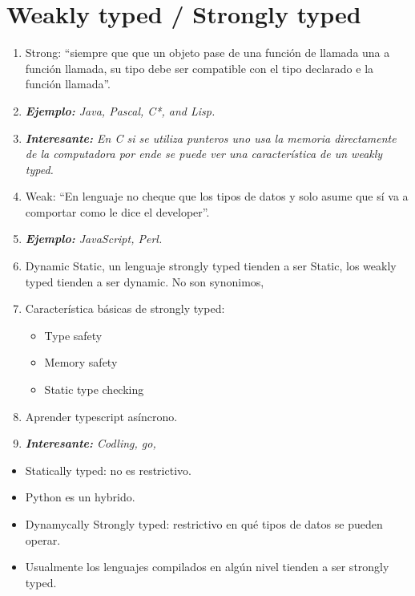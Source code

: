 \section{Weakly typed / Strongly typed}
\begin{enumerate}
    \item Strong: ``siempre que que un objeto pase de una función de llamada una a función llamada, su tipo debe ser compatible con el tipo declarado e la función llamada''.
    \item \emph{\textbf{Ejemplo: }Java, Pascal, C*, and Lisp.}
    \item \emph{\textbf{Interesante:} En C si se utiliza punteros uno usa la memoria directamente de la computadora por ende se puede ver una característica de un weakly typed.}
    \item Weak: ``En lenguaje no cheque que los tipos de datos y solo asume que sí va a comportar como le dice el developer''.
    \item \emph{\textbf{Ejemplo: }JavaScript, Perl.} 
    \item Dynamic Static, un lenguaje strongly typed  tienden a ser Static, los weakly typed tienden a ser dynamic. No son synonimos, 
    
    \item Característica básicas de strongly typed:
        \begin{itemize}
            \item Type safety
            \item Memory safety 
            \item Static type checking
        \end{itemize}

    \item Aprender typescript asíncrono.
    \item \emph{\textbf{Interesante:} Codling, go, }
\end{enumerate}

\begin{itemize}
    \item Statically typed: no es restrictivo.
    \item Python es un hybrido.
    
    \item Dynamycally Strongly typed: restrictivo en qué tipos de datos se pueden operar.
    \item Usualmente los lenguajes compilados en algún nivel tienden a ser strongly typed.
\end{itemize}

